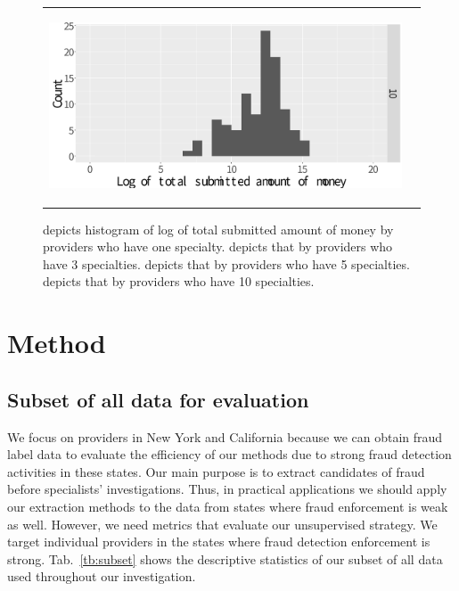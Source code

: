 \documentclass[dvipdfmx, english]{ampmt}             %
\newcommand{\Tabref}[1]{Tab.~\ref{#1}}
\begin{document}
\begin{figure}[ht]
\begin{tabular}{cc}
\begin{minipage}{.5\hsize}
	\subcaption{}\label{fig:5}
      \end{minipage} 
       \begin{minipage}{.5\hsize}
        \centering
        \centerline{\includegraphics[scale=0.22]{../img/spc-type-variance/10.pdf}}
	\subcaption{}\label{fig:10}
      \end{minipage} \\
    \end{tabular}
    
    
     \caption{ depicts histogram of log of total submitted amount of money by providers who have one specialty.  depicts that by providers who have 3 specialties.  depicts that by providers who have 5 specialties.  depicts that by providers who have 10 specialties.}
      \label{fig:num-spc-vari}
\end{figure}



\section{Method}\label{sec:method}
\subsection{Subset of all data for evaluation}
We focus on providers in New York and California because we can obtain fraud label data to evaluate the efficiency of our methods due to strong fraud detection activities in these states.
Our main purpose is to extract candidates of fraud before specialists' investigations. Thus, in practical applications we should apply our extraction methods to the data from states where fraud enforcement is weak as well. However, we need metrics that evaluate our unsupervised strategy. We target individual providers in the states where fraud detection enforcement is strong. \Tabref{tb:subset} shows the descriptive statistics of our subset of all data used throughout our investigation.
\end{document}
